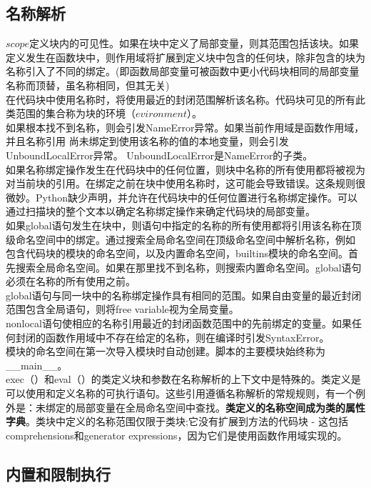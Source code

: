 \documentclass[10pt,UTF8]{ctexart}
\begin{document}
\subsection{名称解析}
$\mathit{scope}$定义块内的可见性。如果在块中定义了局部变量，则其范围包括该块。如果定义发生在函数块中，则作用域将扩展到定义块中包含的任何块，除非包含的块为名称引入了不同的绑定。(即函数局部变量可被函数中更小代码块相同的局部变量名称而顶替，虽名称相同，但其无关)\\
\indent 在代码块中使用名称时，将使用最近的封闭范围解析该名称。代码块可见的所有此类范围的集合称为块的环境（$\mathit{evironment}$）。\\
\indent 如果根本找不到名称，则会引发NameError异常。如果当前作用域是函数作用域，并且名称引用 尚未绑定到使用该名称的值的本地变量，则会引发UnboundLocalError异常。 UnboundLocalError是NameError的子类。\\
\indent 如果名称绑定操作发生在代码块中的任何位置，则块中名称的所有使用都将被视为对当前块的引用。在绑定之前在块中使用名称时，这可能会导致错误。这条规则很微妙。Python缺少声明，并允许在代码块中的任何位置进行名称绑定操作。可以通过扫描块的整个文本以确定名称绑定操作来确定代码块的局部变量。\\
\indent 如果global语句发生在块中，则语句中指定的名称的所有使用都将引用该名称在顶级命名空间中的绑定。通过搜索全局命名空间在顶级命名空间中解析名称，例如 包含代码块的模块的命名空间，以及内置命名空间，builtins模块的命名空间。首先搜索全局命名空间。如果在那里找不到名称，则搜索内置命名空间。global语句必须在名称的所有使用之前。\\
\indent global语句与同一块中的名称绑定操作具有相同的范围。如果自由变量的最近封闭范围包含全局语句，则将free variable视为全局变量。\\
\indent nonlocal语句使相应的名称引用最近的封闭函数范围中的先前绑定的变量。如果任何封闭的函数作用域中不存在给定的名称，则在编译时引发SyntaxError。\\
\indent 模块的命名空间在第一次导入模块时自动创建。脚本的主要模块始终称为__main__。\\
\indent exec（）和eval（）的类定义块和参数在名称解析的上下文中是特殊的。类定义是可以使用和定义名称的可执行语句。这些引用遵循名称解析的常规规则，有一个例外是：未绑定的局部变量在全局命名空间中查找。\textbf{类定义的名称空间成为类的属性字典}。类块中定义的名称范围仅限于类块;它没有扩展到方法的代码块 - 这包括comprehensions和generator expressions，因为它们是使用函数作用域实现的。
\subsection{内置和限制执行}
\end{document}
